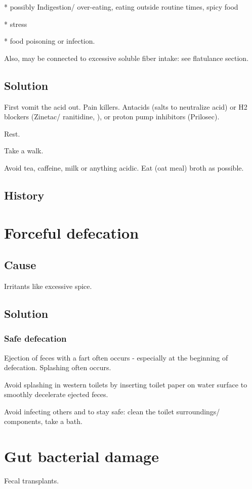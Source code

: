 \documentclass[oneside, article]{memoir}
\begin{document}
    * possibly Indigestion/ over-eating, eating outside routine times, spicy food
    
    * stress
    
    * food poisoning or infection.

Also, may be connected to excessive soluble fiber intake: see flatulance section.

\subsection{Solution}
First vomit the acid out. Pain killers. Antacids (salts to neutralize acid) or H2 blockers (Zinetac/ ranitidine, ), or proton pump inhibitors (Prilosec).

Rest.

Take a walk.

Avoid tea, caffeine, milk or anything acidic. Eat (oat meal) broth as possible.


\subsection{History}

\section{Forceful defecation}
\subsection{Cause}
Irritants like excessive spice.

\subsection{Solution}
\subsubsection{Safe defecation}
Ejection of feces with a fart often occurs - especially at the beginning of defecation. Splashing often occurs.

Avoid splashing in western toilets by inserting toilet paper on water surface to smoothly decelerate ejected feces.

Avoid infecting others and to stay safe: clean the toilet surroundings/ components, take a bath.


\section{Gut bacterial damage}
\tbc Fecal transplants.
\end{document}

